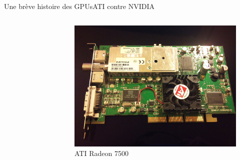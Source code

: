 \documentclass[11pt,mathserif]{beamer}
\begin{document}
\begin{frame}{Une brève histoire des GPUs}{ATI contre NVIDIA}
\begin{columns}[t]
\begin{figure}[htbp]
 \end{figure}
\begin{figure}[htbp]
  \includegraphics[width=0.8\linewidth]{fig/radeon7500.jpg}
      \caption{\tiny ATI Radeon 7500}
    \end{figure}
  \end{columns}
\end{frame}
\end{document}
